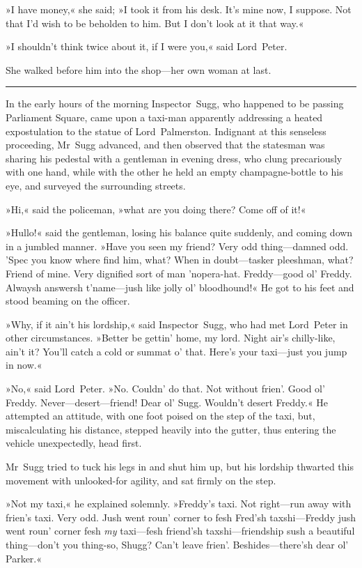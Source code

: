 »I have money,« she said; »I took it from his desk. It's mine now, I suppose. Not that I'd wish to be beholden to him. But I don't look at it that way.«

»I shouldn't think twice about it, if I were you,« said Lord~Peter.

She walked before him into the shop—her own woman at last. 

\noindent\hfil\rule{0.5\textwidth}{.4pt}\hfil 

In the early hours of the morning Inspector~Sugg, who happened to be passing Parliament Square, came upon a taxi-man apparently addressing a heated expostulation to the statue of Lord~Palmerston. Indignant at this senseless proceeding, Mr~Sugg advanced, and then observed that the statesman was sharing his pedestal with a gentleman in evening dress, who clung precariously with one hand, while with the other he held an empty champagne-bottle to his eye, and surveyed the surrounding streets.

»Hi,« said the policeman, »what are you doing there? Come off of it!«

»Hullo!« said the gentleman, losing his balance quite suddenly, and coming down in a jumbled manner. »Have you seen my friend? Very odd thing—damned odd. 'Spec you know where find him, what? When in doubt—tasker pleeshman, what? Friend of mine. Very dignified sort of man 'nopera-hat. Freddy—good ol' Freddy. Alwaysh answersh t'name—jush like jolly ol' bloodhound!« He got to his feet and stood beaming on the officer.

»Why, if it ain't his lordship,« said Inspector~Sugg, who had met Lord~Peter in other circumstances. »Better be gettin' home, my lord. Night air's chilly-like, ain't it? You'll catch a cold or summat o' that.  Here's your taxi—just you jump in now.«

»No,« said Lord~Peter. »No. Couldn' do that. Not without frien'. Good ol' Freddy. Never—desert—friend! Dear ol' Sugg. Wouldn't desert Freddy.« He attempted an attitude, with one foot poised on the step of the taxi, but, miscalculating his distance, stepped heavily into the gutter, thus entering the vehicle unexpectedly, head first.

Mr~Sugg tried to tuck his legs in and shut him up, but his lordship thwarted this movement with unlooked-for agility, and sat firmly on the step.

»Not my taxi,« he explained solemnly. »Freddy's taxi. Not right—run away with frien's taxi. Very odd. Jush went roun' corner to fesh Fred'sh taxshi—Freddy jush went roun' corner fesh \textit{my} taxi—fesh friend'sh taxshi—friendship sush a beautiful thing—don't you thing-so, Shugg? Can't leave frien'. Beshides—there'sh dear ol' Parker.«

